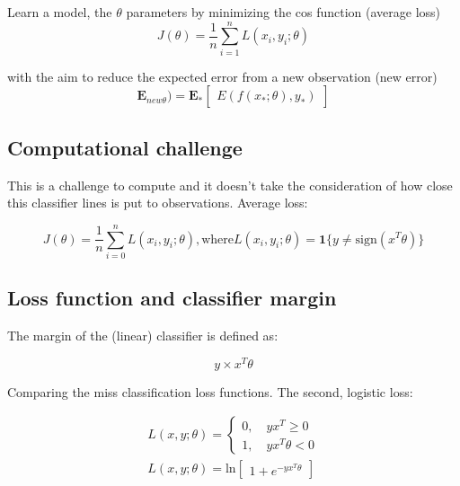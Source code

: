 Learn a model, the $\theta$ parameters by minimizing the cos function (average loss) 
\begin{equation}
J(\theta) = \frac{1} {n} \sum_{i=1}^{n} L(x_i, y_i ; \theta)
\end{equation}

with the aim to reduce the expected error from a new observation (new error) 
\begin{equation}
\textbf{E}_{new\theta}) = \textbf{E}_*\begin{bmatrix} E(f(x_*;\theta), y_*) \end{bmatrix}
\end{equation}

\subsection*{Computational challenge}
This is a challenge to compute and it doesn't take the consideration of how close this classifier lines is put to observations. Average loss:

\begin{equation}
J(\theta) = \frac{1} {n} \sum_{i=0}^{n} L(x_i, y_i;\theta), \text{where} L(x_i, y_i;\theta) = \textbf{1}\{y \neq \text{sign}(x^{T}\theta) \}
\end{equation}

\subsection*{Loss function and classifier margin}
The margin of the (linear) classifier is defined as: 

\begin{equation}
y \times x^{T}\theta
\end{equation}

Comparing the miss classification loss functions. The second, logistic loss: 

\begin{equation}
\begin{aligned}
L(x,y;\theta) = \begin{cases} 0, \quad yx^{T} \ge 0 \\ 1, \quad yx^{T}\theta < 0 \end{cases} \\
L(x, y;\theta) = \text{ln}\begin{bmatrix} 1 + e^{-yx^{T}\theta} \end{bmatrix}
\end{aligned}
\end{equation}

